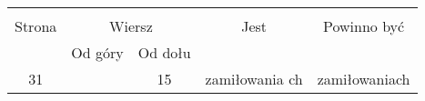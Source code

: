 \documentclass[a4paper,11pt]{article}
\begin{document}
\newpage
{}

\vspace{\spaceThree}






\begin{center}
  \begin{tabular}{|c|c|c|c|c|}
    \hline
    & \multicolumn{2}{c|}{} & & \\
    Strona & \multicolumn{2}{c|}{Wiersz} & Jest
                              & Powinno być \\ \cline{2-3}
    & Od góry & Od dołu & & \\
    \hline
    31  & & 15 & zamiłowania ch & zamiłowaniach \\
    \hline
  \end{tabular}
\end{center}

\vspace{\spaceTwo}





 {}



\end{document}
